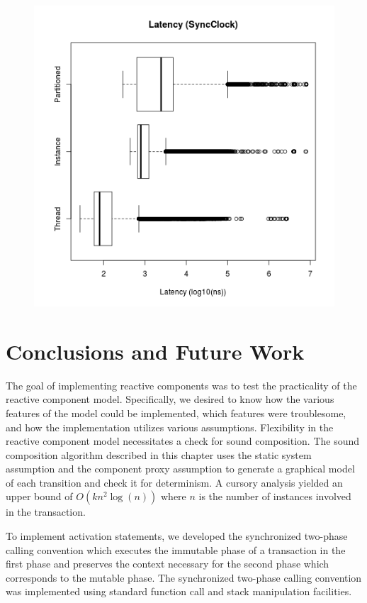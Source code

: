 \begin{figure}
\center
\includegraphics[height=.4\textheight]{sync_latency_box.png}
\caption{\label{sync_latency_box}}
\end{figure}

\clearpage

\section{Conclusions and Future Work}

The goal of implementing reactive components was to test the practicality of the reactive component model.
Specifically, we desired to know how the various features of the model could be implemented, which features were troublesome, and how the implementation utilizes various assumptions.
Flexibility in the reactive component model necessitates a check for sound composition.
The sound composition algorithm described in this chapter uses the static system assumption and the component proxy assumption to generate a graphical model of each transition and check it for determinism.
A cursory analysis yielded an upper bound of $O(k n^2 \log (n))$ where $n$ is the number of instances involved in the transaction.

To implement activation statements, we developed the synchronized two-phase calling convention which executes the immutable phase of a transaction in the first phase and preserves the context necessary for the second phase which corresponds to the mutable phase.
The synchronized two-phase calling convention was implemented using standard function call and stack manipulation facilities.

